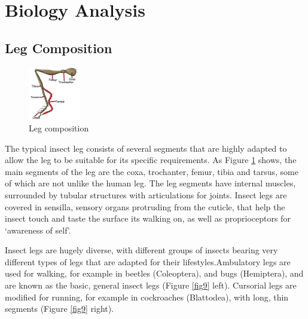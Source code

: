 \documentclass[conference]{IEEEtran}
\begin{document}
\section{Biology Analysis}\label{s2}

\subsection{Leg Composition} 
\begin{figure}
    \centerline{\includegraphics[width=0.2\textwidth]{leg.png}}
    \caption{Leg composition}
    \label{fig8}
\end{figure}

The typical insect leg consists of several segments that are highly adapted to allow the leg to be suitable for its specific requirements. As Figure \ref{fig8} shows, the main segments of the leg are the coxa, trochanter, femur, tibia and tarsus, some of which are not unlike the human leg.\cite{b1} The leg segments have internal muscles, surrounded by tubular structures with articulations for joints. Insect legs are covered in sensilla, sensory organs protruding from the cuticle, that help the insect touch and taste the surface its walking on, as well as proprioceptors for ‘awareness of self’.\cite{b2}

Insect legs are hugely diverse, with different groups of insects bearing very different types of legs that are adapted for their lifestyles.Ambulatory legs are used for walking, for example in beetles (Coleoptera), and bugs (Hemiptera), and are known as the basic, general insect legs (Figure \ref{fig9} left)\cite{b3}. Cursorial legs are modified for running, for example in cockroaches (Blattodea), with long, thin segments (Figure \ref{fig9} right)\cite{b3}.
\end{document}
